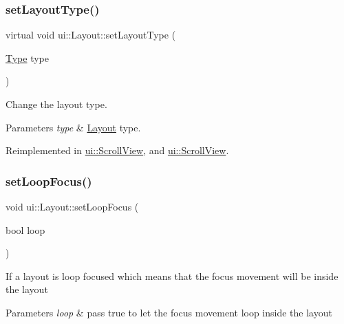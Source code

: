 \subsubsection{\texorpdfstring{set\+Layout\+Type()}{setLayoutType()}\hspace{0.1cm}{\footnotesize\ttfamily [2/2]}}
{\footnotesize\ttfamily virtual void ui\+::\+Layout\+::set\+Layout\+Type (\begin{DoxyParamCaption}\item[{\hyperlink{classui_1_1Layout_aecabbc1592677eadd6757edc1df5b952}{Type}}]{type }\end{DoxyParamCaption})\hspace{0.3cm}{\ttfamily [virtual]}}

Change the layout type. 
\begin{DoxyParams}{Parameters}
{\em type} & \hyperlink{classui_1_1Layout}{Layout} type. \\
\hline
\end{DoxyParams}


Reimplemented in \hyperlink{classui_1_1ScrollView_a4056a0a2c5653b6e00fa983740f621d9}{ui\+::\+Scroll\+View}, and \hyperlink{classui_1_1ScrollView_a3dc215785981958746d0e12ef5ce5d92}{ui\+::\+Scroll\+View}.

\mbox{\label{classui_1_1Layout_aff48ab68a81a6c065c3e7aaed4eafa29}} 
\subsubsection{\texorpdfstring{set\+Loop\+Focus()}{setLoopFocus()}\hspace{0.1cm}{\footnotesize\ttfamily [1/2]}}
{\footnotesize\ttfamily void ui\+::\+Layout\+::set\+Loop\+Focus (\begin{DoxyParamCaption}\item[{bool}]{loop }\end{DoxyParamCaption})}

If a layout is loop focused which means that the focus movement will be inside the layout 
\begin{DoxyParams}{Parameters}
{\em loop} & pass true to let the focus movement loop inside the layout \\
\hline
\end{DoxyParams}
\mbox{\label{classui_1_1Layout_aff48ab68a81a6c065c3e7aaed4eafa29}} 
